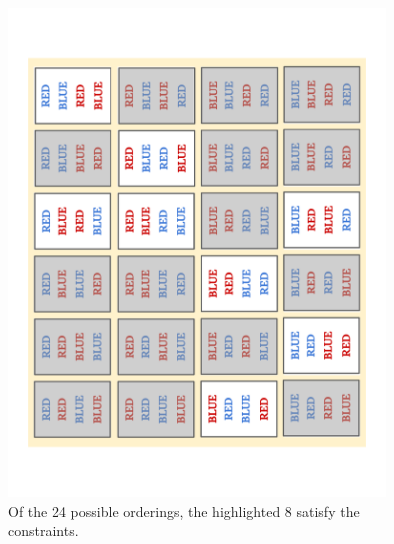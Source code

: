 \begin{figure}
    \centerline{\includegraphics[angle=270,origin=c,width=10cm]{fig_valid_seqs}}
    \caption{Of the 24 possible orderings, the highlighted 8 satisfy the constraints.}%
    \label{fig:valid_seqs}%
\end{figure}
